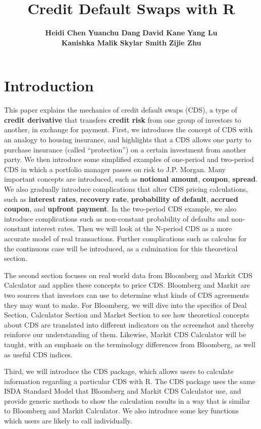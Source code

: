 \documentclass{jss}
\author{
\fontsize{12pt}{14.4} \textbf{Heidi Chen} \hspace{10pt} 
\fontsize{12pt}{14.4} \textbf{Yuanchu Dang} \hspace{10pt} 
\fontsize{12pt}{14.4} \textbf{David Kane} \hspace{10pt} 
\fontsize{12pt}{14.4} \textbf{Yang Lu} \hspace{10pt} 
\\ 
\fontsize{12pt}{14.4} \textbf{Kanishka Malik} \hspace{10pt} 
\fontsize{12pt}{14.4} \textbf{Skylar Smith} \hspace{10pt} 
\fontsize{12pt}{14.4} \textbf{Zijie Zhu} \hspace{10pt} }
\title{Credit Default Swaps with R}
\begin{document}
\section{Introduction}
\label{sec:Introduction}


This paper explains the mechanics of credit default swaps (CDS), a type of \textbf{credit derivative} that transfers \textbf{credit risk} from one group of investors to another, in exchange for payment. First, we introduces the concept of CDS with an analogy to housing insurance, and highlights that a CDS allows one party to purchase insurance (called ``protection'') on a certain investment from another party. We then introduce some simplified examples of one-period and two-period CDS in which a portfolio manager passes on risk to J.P. Morgan. Many important concepts are introduced, such as \textbf{notional amount}, \textbf{coupon}, \textbf{spread}. We also gradually introduce complications that alter CDS pricing calculations, such as \textbf{interest rates}, \textbf{recovery rate}, \textbf{probability of default}, \textbf{accrued coupon}, and \textbf{upfront payment}. In the two-period CDS example, we also introduce complications such as non-constant probability of defaults and non-constant interest rates. Then we will look at the N-period CDS as a more accurate model of real transactions. Further complications such as calculus for the continuous case will be introduced, as a culmination for this theoretical section.
  
The second section focuses on real world data from Bloomberg and Markit CDS Calculator and applies these concepts to price CDS. Bloomberg and Markit are two sources that investors can use to determine what kinds of CDS agreements they may want to make. For Bloomberg, we will dive into the specifics of Deal Section, Calculator Section and Market Section to see how theoretical concepts about CDS are translated into different indicators on the screenshot and thereby reinforce our understanding of them. Likewise, Markit CDS Calculator will be taught, with an emphasis on the terminology differences from Bloomberg, as well as useful CDS indices.

Third, we will introduce the CDS package, which allows users to calculate information regarding a particular CDS with R. The CDS package uses the same ISDA Standard Model that Bloomberg and Markit CDS Calculator use, and provide generic methods to show the calculation results in a way that is similar to Bloomberg and Markit Calculator. We also introduce some key functions which users are likely to call individually.
\end{document}
